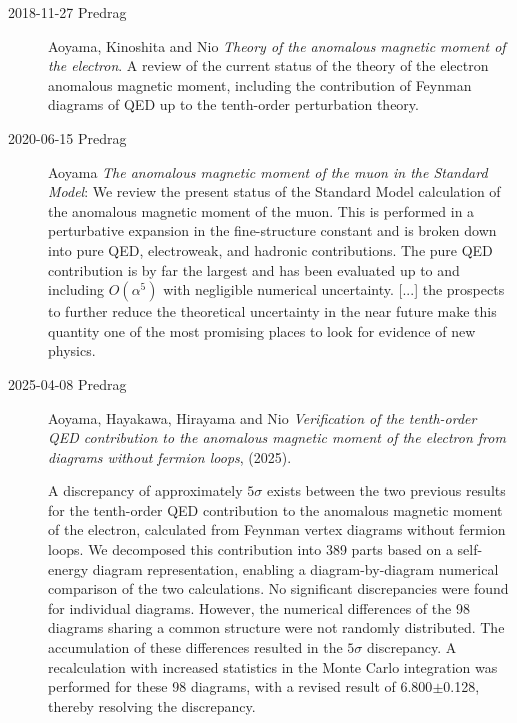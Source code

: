 \begin{description}
\item[2018-11-27 Predrag]
Aoyama, Kinoshita and Nio
{\em Theory of the anomalous magnetic moment of the electron}.
A review of the current status of the theory of the electron anomalous
magnetic moment, including the contribution of Feynman diagrams of QED up
to the tenth-order perturbation theory.

\item[2020-06-15 Predrag]
Aoyama \etal{}
{\em The anomalous magnetic moment of the muon in the {Standard Model}}:
We review the present status of the Standard Model calculation of the
anomalous magnetic moment of the muon. This is performed in a
perturbative expansion in the fine-structure constant and is broken down
into pure QED, electroweak, and hadronic contributions. The pure QED
contribution is by far the largest and has been evaluated up to and
including $O(\alpha^5)$ with negligible numerical uncertainty. [...] the
prospects to further reduce the theoretical uncertainty in the near
future make this quantity one of the most promising places to look for
evidence of new physics.

\item[2025-04-08 Predrag]
Aoyama, Hayakawa, Hirayama and Nio
{\em Verification of the tenth-order {QED} contribution to the anomalous 
magnetic moment of the electron from diagrams without fermion loops}, 
(2025).

A discrepancy of approximately $5\sigma$ exists between the two previous 
results for the tenth-order QED contribution to the anomalous magnetic 
moment of the electron, calculated from Feynman vertex diagrams without 
fermion loops. We decomposed this contribution into 
389 parts based on a self-energy diagram representation, enabling a 
diagram-by-diagram numerical comparison of the two calculations. No 
significant discrepancies were found for individual diagrams. However, 
the numerical differences of the 98 diagrams sharing a common structure 
were not randomly distributed. The accumulation of these differences 
resulted in the $5\sigma$ discrepancy. A recalculation with increased 
statistics in the Monte Carlo integration was performed for these 98 
diagrams, with a revised result of 6.800$\pm$0.128, thereby 
resolving the discrepancy. 


\end{description}
